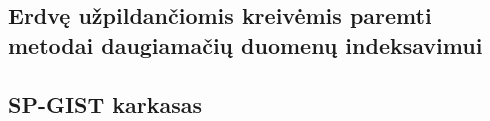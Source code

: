 \subsection{Erdvę užpildančiomis kreivėmis paremti metodai daugiamačių duomenų indeksavimui}


\subsection{SP-GIST karkasas}
